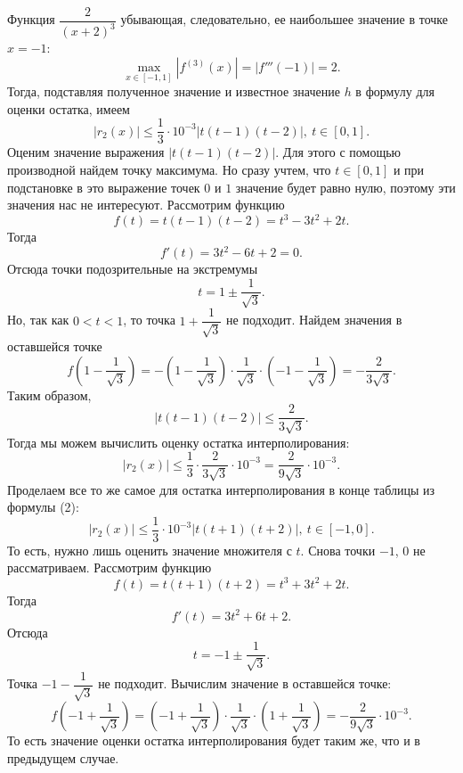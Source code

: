 \documentclass[a4paper, 12pt]{article}
\renewcommand{\leq}{\leqslant}
\begin{document}
	Функция $\dfrac{2}{(x+2)^3}$ убывающая, следовательно, ее наибольшее значение в точке $x=-1$: $$\underset{x\in[-1,1]}{\max}|f^{(3)}(x)|= |f'''(-1)|= 2.$$
	Тогда, подставляя полученное значение и известное значение $h$ в формулу для оценки остатка, имеем $$|r_2(x)| \leq \dfrac{1}{3}\cdot10^{-3}\left|t(t-1)(t-2)\right|,\ t\in [0,1].$$
	Оценим значение выражения $\left|t(t-1)(t-2)\right|$. Для этого с помощью производной найдем точку максимума. Но сразу учтем, что $t\in [0,1]$ и при подстановке в это выражение точек $0$ и $1$ значение будет равно нулю, поэтому эти значения нас не интересуют. Рассмотрим функцию $$f(t) = t(t-1)(t-2) = t^3 - 3t^2 + 2t.$$
	Тогда $$f'(t) = 3t^2 - 6t + 2=0.$$
	Отсюда точки подозрительные на экстремумы $$t = 1\pm \dfrac{1}{\sqrt 3}.$$
	Но, так как $0<t<1$, то точка $1 + \dfrac{1}{\sqrt3}$ не подходит.
	Найдем значения в оставшейся точке
	$$f\left(1- \dfrac{1}{\sqrt 3}\right) = -\left(1- \dfrac{1}{\sqrt 3}\right)\cdot \dfrac{1}{\sqrt 3} \cdot \left(-1- \dfrac{1}{\sqrt 3}\right) = -\dfrac{2}{3\sqrt3}.$$
	Таким образом, $$\left|t(t-1)(t-2)\right|\leq \dfrac{2}{3\sqrt3}.$$
	Тогда мы можем вычислить оценку остатка интерполирования:
	$$|r_2(x)| \leq \dfrac{1}{3}\cdot \dfrac{2}{3\sqrt3}\cdot10^{-3}=\dfrac{2}{9\sqrt3}\cdot10^{-3}.$$
	Проделаем все то же самое для остатка интерполирования в конце таблицы из формулы (2): $$|r_2(x)| \leq \dfrac{1}{3}\cdot10^{-3}\left|t(t+1)(t+2)\right|,\ t\in [-1,0].$$
	То есть, нужно лишь оценить значение множителя с $t$. Снова точки $-1$, $0$ не рассматриваем. Рассмотрим функцию $$f(t) = t(t+1)(t+2) = t^3 + 3t^2 + 2t.$$
	Тогда $$f'(t) = 3t^2 + 6t + 2.$$
	Отсюда $$t = -1 \pm \dfrac{1}{\sqrt3}.$$
	Точка $-1 - \dfrac{1}{\sqrt3}$ не подходит. Вычислим значение в оставшейся точке: $$f\left(-1 + \dfrac{1}{\sqrt3}\right) = \left(-1 + \dfrac{1}{\sqrt3}\right)\cdot \dfrac{1}{\sqrt3}\cdot \left(1 + \dfrac{1}{\sqrt3}\right) = -\dfrac{2}{9\sqrt3}\cdot10^{-3}.$$
	То есть значение оценки остатка интерполирования будет таким же, что и в предыдущем случае.
\end{document}

